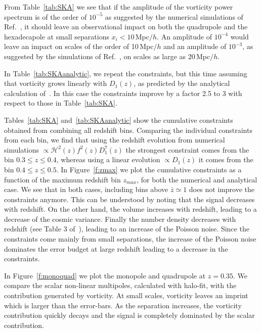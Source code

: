 \documentclass[a4paper,twocolumn,aps,prd,nolongbibliography,superscriptaddress,showpacs,showkeys,amsmath,amssymb,floatfix,nofootinbib]{revtex4-1}
\renewcommand{\[}{\begin{equation}}
\renewcommand{\]}{\end{equation}}
\newcommand{\Hcal}{\mathcal{H}}
\begin{document}
From Table~\ref{tab:SKA} we see that if the amplitude of the vorticity power spectrum is of the order of $10^{-5}$ as suggested by the numerical simulations of Ref.~\cite{Pueblas:2008uv},  it should leave an observational impact on both the quadrupole and the hexadecapole at small separations $x_i < 10$\,Mpc$/h$. An amplitude of $10^{-4}$ would leave an impact on scales of the order of 10\,Mpc$/h$ and an amplitude of $10^{-3}$, as suggested by the simulations of Ref.~\cite{Zhu:2017vtj}, on scales as large as 20\,Mpc$/h$. 

In Table~\ref{tab:SKAanalytic}, we repeat the constraints, but this time assuming that vorticity grows linearly with $D_1(z)$, as predicted by the analytical calculation of~\cite{Cusin:2016zvu}. In this case the constraints improve by a factor 2.5 to 3 with respect to those in Table~\ref{tab:SKA}.

Tables~\ref{tab:SKA} and~\ref{tab:SKAanalytic} show the cumulative constraints obtained from combining all redshift bins. Comparing the individual constraints from each bin, we find that using the redshift evolution from numerical simulations $\propto \Hcal^2(z)f^2(z)D_1^7(z)$ the strongest constraint comes from the bin $0.3\leq z\leq 0.4$, whereas using a linear evolution $\propto D_1(z)$ it comes from the bin $0.4\leq z\leq 0.5$. In Figure~\ref{f:zmax} we plot the cumulative constraints as a function of the maximum redshift bin $z_{max}$, for both the numerical and analytical case. We see that in both cases, including bins above $\bar z\simeq1$ does not improve the constraints anymore. This can be understood by noting that the signal decreases with redshift. 
On the other hand, the volume increases with redshift, leading to a decrease of the cosmic variance. Finally the number density decreases with redshift (see Table 3 of~\cite{Bull:2015lja}), leading to an increase of the Poisson noise. Since the constraints come mainly from small separations, the increase of the Poisson noise dominates the error budget at large redshift leading to a decrease in the constraints.

In Figure~\ref{f:monoquad} we plot the monopole and quadrupole at $z=0.35$. We compare the scalar non-linear multipoles, calculated with halo-fit, with the contribution generated by vorticity. At small scales, vorticity leaves an imprint which is larger than the error-bars. As the separation increases, the vorticity contribution quickly decays and the signal is completely dominated by the scalar contribution. 
\end{document}

